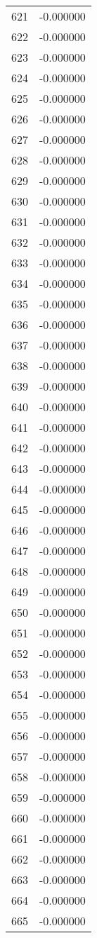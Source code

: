 \documentclass[12pt]{article}
\begin{document}
\begin{longtable}{@{}cc@{}}
621 & -0.000000 \\
622 & -0.000000 \\
623 & -0.000000 \\
624 & -0.000000 \\
625 & -0.000000 \\
626 & -0.000000 \\
627 & -0.000000 \\
628 & -0.000000 \\
629 & -0.000000 \\
630 & -0.000000 \\
631 & -0.000000 \\
632 & -0.000000 \\
633 & -0.000000 \\
634 & -0.000000 \\
635 & -0.000000 \\
636 & -0.000000 \\
637 & -0.000000 \\
638 & -0.000000 \\
639 & -0.000000 \\
640 & -0.000000 \\
641 & -0.000000 \\
642 & -0.000000 \\
643 & -0.000000 \\
644 & -0.000000 \\
645 & -0.000000 \\
646 & -0.000000 \\
647 & -0.000000 \\
648 & -0.000000 \\
649 & -0.000000 \\
650 & -0.000000 \\
651 & -0.000000 \\
652 & -0.000000 \\
653 & -0.000000 \\
654 & -0.000000 \\
655 & -0.000000 \\
656 & -0.000000 \\
657 & -0.000000 \\
658 & -0.000000 \\
659 & -0.000000 \\
660 & -0.000000 \\
661 & -0.000000 \\
662 & -0.000000 \\
663 & -0.000000 \\
664 & -0.000000 \\
665 & -0.000000 \\

\end{longtable}
\end{document}
